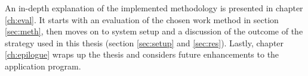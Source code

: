 An in-depth explanation of the implemented methodology is presented in chapter \ref{ch:eval}. It starts with an evaluation of the chosen work method in section \ref{sec:meth}, then moves on to system setup and a discussion of the outcome of the strategy used in this thesis (section \ref{sec:setup} and \ref{sec:res}). Lastly, chapter \ref{ch:epilogue} wraps up the thesis and considers future enhancements to the application program.